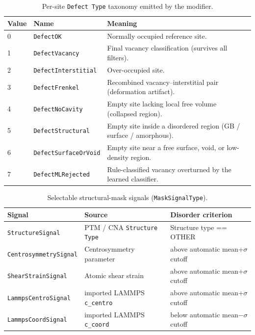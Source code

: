 \documentclass[11pt]{article}
\newcommand{\code}[1]{\texttt{#1}}
\newcommand{\attr}[1]{\texttt{#1}}
\begin{document}
\begin{table}[h]
\centering
\caption{Per-site \attr{Defect Type} taxonomy emitted by the modifier.}
\label{tab:defecttypes}
\begin{tabular}{@{}llp{7.5cm}@{}}
\toprule
Value & Name & Meaning \\
\midrule
0 & \attr{DefectOK} & Normally occupied reference site. \\
1 & \attr{DefectVacancy} & Final vacancy classification (survives all filters). \\
2 & \attr{DefectInterstitial} & Over-occupied site. \\
3 & \attr{DefectFrenkel} & Recombined vacancy--interstitial pair (deformation artifact). \\
4 & \attr{DefectNoCavity} & Empty site lacking local free volume (collapsed region). \\
5 & \attr{DefectStructural} & Empty site inside a disordered region (GB / surface / amorphous). \\
6 & \attr{DefectSurfaceOrVoid} & Empty site near a free surface, void, or low-density region. \\
7 & \attr{DefectMLRejected} & Rule-classified vacancy overturned by the learned classifier. \\
\bottomrule
\end{tabular}
\end{table}

\begin{table}[h]
\centering
\caption{Selectable structural-mask signals (\attr{MaskSignalType}).}
\label{tab:masksignals}
\begin{tabular}{@{}llp{7.5cm}@{}}
\toprule
Signal & Source & Disorder criterion \\
\midrule
\attr{StructureSignal} & PTM / CNA \attr{Structure Type} & Structure type == OTHER \\
\attr{CentrosymmetrySignal} & Centrosymmetry parameter & above automatic mean+$\sigma$ cutoff \\
\attr{ShearStrainSignal} & Atomic shear strain & above automatic mean+$\sigma$ cutoff \\
\attr{LammpsCentroSignal} & imported LAMMPS \code{c\_centro} & above automatic mean+$\sigma$ cutoff \\
\attr{LammpsCoordSignal} & imported LAMMPS \code{c\_coord} & below automatic mean$-\sigma$ cutoff \\
\bottomrule
\end{tabular}
\end{table}
\end{document}
